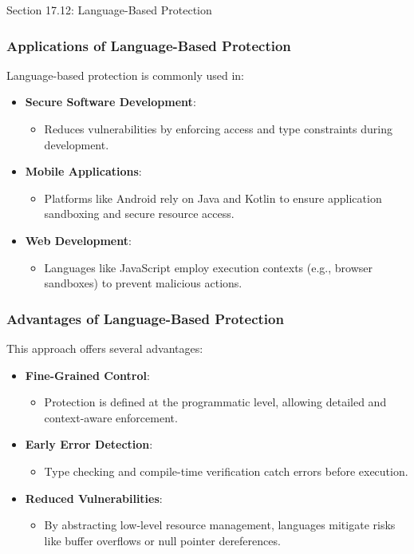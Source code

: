 \begin{notes}{Section 17.12: Language-Based Protection}
    \subsubsection*{Applications of Language-Based Protection}
    
    Language-based protection is commonly used in:
    \begin{itemize}
        \item \textbf{Secure Software Development}:
        \begin{itemize}
            \item Reduces vulnerabilities by enforcing access and type constraints during development.
        \end{itemize}
        \item \textbf{Mobile Applications}:
        \begin{itemize}
            \item Platforms like Android rely on Java and Kotlin to ensure application sandboxing and secure resource access.
        \end{itemize}
        \item \textbf{Web Development}:
        \begin{itemize}
            \item Languages like JavaScript employ execution contexts (e.g., browser sandboxes) to prevent malicious actions.
        \end{itemize}
    \end{itemize}
    
    \subsubsection*{Advantages of Language-Based Protection}
    
    This approach offers several advantages:
    \begin{itemize}
        \item \textbf{Fine-Grained Control}:
        \begin{itemize}
            \item Protection is defined at the programmatic level, allowing detailed and context-aware enforcement.
        \end{itemize}
        \item \textbf{Early Error Detection}:
        \begin{itemize}
            \item Type checking and compile-time verification catch errors before execution.
        \end{itemize}
        \item \textbf{Reduced Vulnerabilities}:
        \begin{itemize}
            \item By abstracting low-level resource management, languages mitigate risks like buffer overflows or null pointer dereferences.
        \end{itemize}
    \end{itemize}
    

\end{notes}
